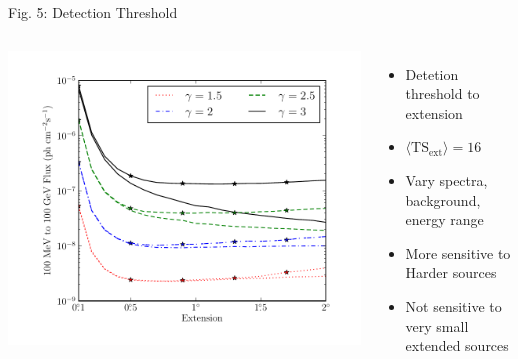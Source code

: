 \documentclass[12pt]{beamer}
\begin{document}
\begin{frame}{Fig. 5: Detection Threshold}
  \begin{columns}
    \includegraphics[scale=0.5]{plots/index_sensitivity_color.pdf}
    \begin{itemize}
      \item Detetion threshold to extension
      \item $\langle\text{TS}_\text{ext}\rangle=16$
      \item Vary spectra, background, energy range
      \item More sensitive to Harder sources
      \item Not sensitive to very small extended sources
    \end{itemize}
  \end{columns}
\end{frame}
\end{document}
